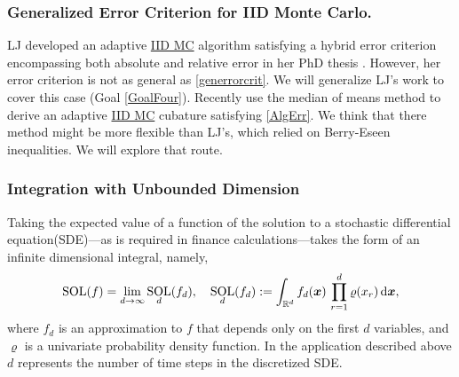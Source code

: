 \documentclass[11pt]{NSFamsart}
\newcommand{\IIDMC}{\hyperlink{IIDMClink}{IID MC}\xspace}
\newcommand{\reals}{{\mathbb{R}}}
\DeclareMathOperator{\SOL}{SOL}
\newcommand{\bx}{{\boldsymbol{x}}}
\def\dif{\textup{d}}
\begin{document}
\subsubsection{Generalized Error Criterion for IID Monte Carlo.}  LJ developed an adaptive \IIDMC algorithm satisfying a hybrid error criterion encompassing both absolute and relative error in her PhD thesis \cite{Jia16a}.  However, her error criterion is not as general as \eqref{generrorcrit}.  We will generalize LJ's work to 
cover this case (Goal \ref{GoalFour}).  Recently \cite{KunEtal19a} use the median of means method to derive an adaptive \IIDMC cubature satisfying \eqref{AlgErr}.  We think that there method might be more flexible than  LJ's, which relied on Berry-Eseen inequalities.  We will explore that route.


\subsubsection{Integration with Unbounded Dimension} \label{sec:InfDim}

Taking the expected value of a function of the solution to a stochastic differential equation(SDE)---as is required in finance calculations---takes the form of an infinite dimensional integral, namely,
\[
\SOL(f) = \lim_{d \to \infty} \SOL_d(f_d), \quad \SOL_d(f_d):= \int_{\reals^d} f_d(\bx) \, \prod_{r=1}^{d} \varrho(x_r) \, \dif \bx, 
\]
where $f_d$ is an  approximation to $f$ that depends only on the first $d$ variables, and $\varrho$ 
is a univariate probability density function.  In the application described above $d$ represents the number of time steps in the discretized SDE.
\end{document}
